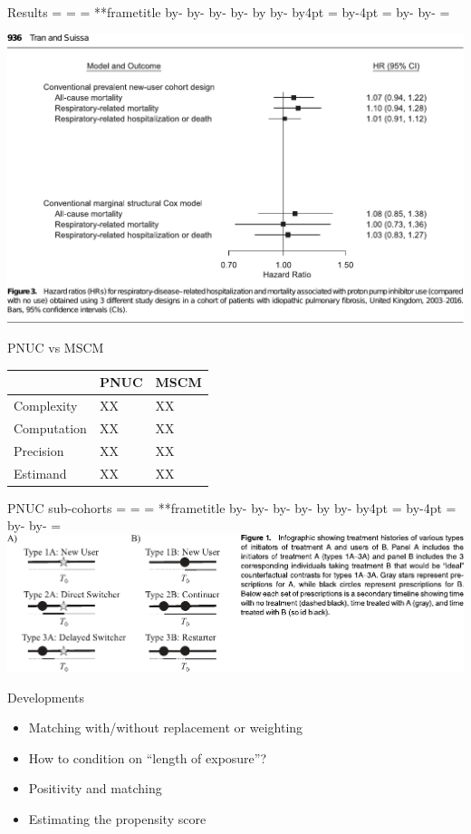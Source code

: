 \documentclass[aspectratio=169,12pt]{beamer} %
\makeatletter
\newif\ifsidebartheme
\newcommand*{\calculatespace}{%
    \contentheight=\paperheight%
    \ifx\beamer@frametitle\@empty%
        \setbox\@tempboxa=\box\voidb@x%
      \else%
        \setbox\@tempboxa=\vbox{%
          \vbox{}%
          {\parskip0pt\usebeamertemplate***{frametitle}}%
        }%
        \ifsidebartheme%
          \advance\contentheight by-1em%
        \fi%
      \fi%
    \advance\contentheight by-\ht\@tempboxa%
    \advance\contentheight by-\dp\@tempboxa%
    \advance\contentheight by-\beamer@frametopskip%
    \ifbeamer@plainframe%
    \contentbottom=0pt%
    \else%
    \advance\contentheight by-\headheight%
    \advance\contentheight by\headdp%
    \advance\contentheight by-\footheight%
    \advance\contentheight by4pt%
    \contentbottom=\footheight%
    \advance\contentbottom by-4pt%
    \fi%
    \contentwidth=\paperwidth%
    \ifbeamer@plainframe%
    \contentleft=0pt%
    \else%
    \advance\contentwidth by-\beamer@rightsidebar%
    \advance\contentwidth by-\beamer@leftsidebar\relax%
    \contentleft=\beamer@leftsidebar%
    \fi%
}
\makeatother
\begin{document}
\begin{frame}{Results}
    \calculatespace%
    \begin{center}
	\includegraphics[height=0.90\contentheight]{ref/suissa-fig3-mscm.pdf}
    \end{center}
\end{frame}

\begin{frame}{PNUC vs MSCM}
	\centering
	\begin{tabular}{lll}
	\hline
		& PNUC & MSCM \\
	\hline
		Complexity & XX & XX \\
		Computation & XX & XX \\
		Precision & XX & XX \\
		Estimand & XX & XX \\
	\hline
	\end{tabular}
\end{frame}

\begin{frame}{PNUC sub-cohorts}
    \calculatespace%
	\includegraphics[width=0.85\contentwidth]{ref/webster-fig1.pdf}
\end{frame}

\begin{frame}{Developments}
    \begin{itemize}
	\item Matching with/without replacement or weighting
	\item How to condition on ``length of exposure''?
	\item Positivity and matching
	\item Estimating the propensity score
    \end{itemize}
\end{frame}
\end{document}
